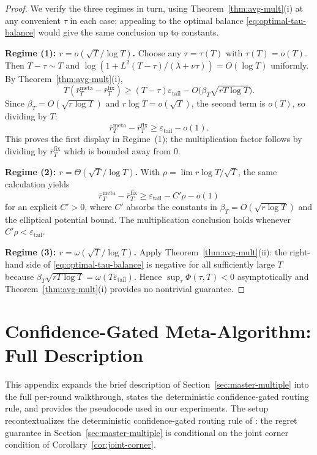 \documentclass{article}
\theoremstyle{definition}
\theoremstyle{remark}
\newcommand{\meta}{\mathrm{meta}}
\newcommand{\fix}{\mathrm{fix}}
\theoremstyle{remark}
\begin{document}
\begin{proof}
We verify the three regimes in turn, using
Theorem~\ref{thm:avg-mult}(i) at any convenient $\tau$ in each case;
appealing to the optimal balance \eqref{eq:optimal-tau-balance} would
give the same conclusion up to constants.

\noindent\textbf{Regime (1): $r=o(\sqrt{T}/\log T)$.}
Choose any $\tau=\tau(T)$ with $\tau(T)=o(T)$. Then
$T-\tau\sim T$ and
$\log(1+L^2(T-\tau)/(\lambda+\nu\tau))=O(\log T)$ uniformly. By
Theorem~\ref{thm:avg-mult}(i),
\[
T(\bar r_T^{\meta}-\bar r_T^{\fix})
\ge
(T-\tau)\varepsilon_{\mathrm{tail}} - O\!\bigl(\beta_T\sqrt{rT\log T}\bigr).
\]
Since $\beta_T=O(\sqrt{r\log T})$ and $r\log T=o(\sqrt T)$, the second
term is $o(T)$, so dividing by $T$:
\[
\bar r_T^{\meta}-\bar r_T^{\fix}\ge \varepsilon_{\mathrm{tail}}-o(1).
\]
This proves the first display in Regime~(1); the multiplication factor
follows by dividing by $\bar r_T^{\fix}$ which is bounded away from $0$.

\noindent\textbf{Regime (2): $r=\Theta(\sqrt T/\log T)$.}
With $\rho=\lim r\log T/\sqrt T$, the same calculation yields
\[
\bar r_T^{\meta}-\bar r_T^{\fix}\ge\varepsilon_{\mathrm{tail}}-C'\rho-o(1)
\]
for an explicit $C'>0$, where $C'$ absorbs the constants in
$\beta_T=O(\sqrt{r\log T})$ and the elliptical potential bound. The
multiplication conclusion holds whenever $C'\rho<\varepsilon_{\mathrm{tail}}$.

\noindent\textbf{Regime (3): $r=\omega(\sqrt T/\log T)$.}
Apply Theorem~\ref{thm:avg-mult}(ii): the right-hand side of
\eqref{eq:optimal-tau-balance} is negative for all sufficiently large $T$
because $\beta_T\sqrt{rT\log T}=\omega(T\varepsilon_{\mathrm{tail}})$.
Hence $\sup_\tau\Phi(\tau,T)<0$ asymptotically and
Theorem~\ref{thm:avg-mult}(i) provides no nontrivial guarantee.
\end{proof}


\section{Confidence-Gated Meta-Algorithm: Full Description}
\label{app:meta-algorithm}

This appendix expands the brief description of
Section~\ref{sec:master-multiple} into the full per-round walkthrough,
states the deterministic confidence-gated routing rule, and provides
the pseudocode used in our experiments. The setup recontextualizes the
deterministic confidence-gated routing rule of
\cite{chen2024llmdecision}: the regret guarantee in
Section~\ref{sec:master-multiple} is conditional on the joint
corner condition of Corollary~\ref{cor:joint-corner}.
\end{document}
